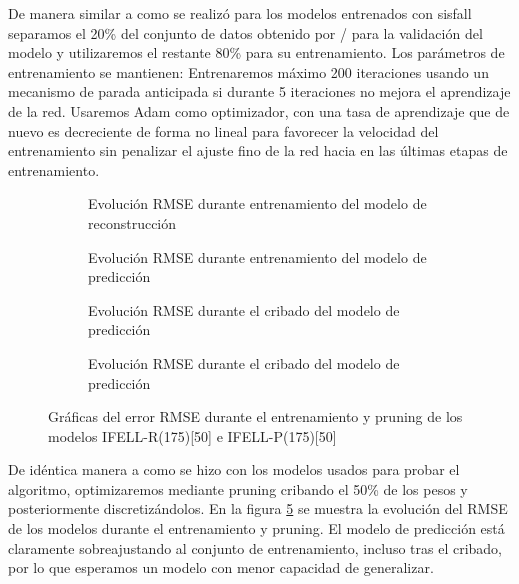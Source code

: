 De manera similar a como se realizó para los modelos entrenados con sisfall separamos el 20\% del conjunto de datos obtenido por \accelcapture/ para la validación del modelo y utilizaremos el restante 80\% para su entrenamiento. Los parámetros de entrenamiento se mantienen: Entrenaremos máximo 200 iteraciones usando un mecanismo de parada anticipada si durante 5 iteraciones no mejora el aprendizaje de la red. Usaremos Adam como optimizador, con una tasa de aprendizaje que de nuevo es decreciente de forma no lineal para favorecer la velocidad del entrenamiento sin penalizar el ajuste fino de la red hacia en las últimas etapas de entrenamiento. 

\begin{figure}[htb!]
  \centering
  \begin{subfigure}[b]{0.47\textwidth}
      \centering
      \caption{\footnotesize \label{fig:ifell:adata:recon:train} Evolución RMSE durante entrenamiento del modelo de reconstrucción}
  \end{subfigure}
  \centering
  \hfill
  \begin{subfigure}[b]{0.47\textwidth}
      \centering
      \caption{\footnotesize \label{fig:ifell:adata:pred:train} Evolución RMSE durante entrenamiento del modelo de predicción}
  \end{subfigure}

  \begin{subfigure}[b]{0.47\textwidth}
      \centering
      \caption{\footnotesize \label{fig:ifell:adata:recon:prune} Evolución RMSE durante el cribado del modelo de predicción}
  \end{subfigure}
  \begin{subfigure}[b]{0.47\textwidth}
      \centering
      \caption{\footnotesize \label{fig:ifell:adata:pred:prune} Evolución RMSE durante el cribado del modelo de predicción}
  \end{subfigure}
  \caption{\label{fig:ifell:adata:training} Gráficas del error RMSE durante el entrenamiento y pruning de los modelos IFELL-R(175)[50] e IFELL-P(175)[50]}
\end{figure}
De idéntica manera a como se hizo con los modelos usados para probar el algoritmo, optimizaremos mediante pruning cribando el 50\% de los pesos y posteriormente discretizándolos. En la figura \ref{fig:ifell:adata:training} se muestra la evolución del RMSE de los modelos durante el entrenamiento y pruning. El modelo de predicción está claramente sobreajustando al conjunto de entrenamiento, incluso tras el cribado, por lo que esperamos un modelo con menor capacidad de generalizar.

